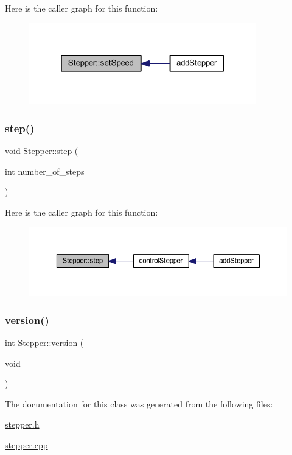 Here is the caller graph for this function\+:
\nopagebreak
\begin{figure}[H]
\begin{center}
\leavevmode
\includegraphics[width=280pt]{dc/db2/class_stepper_a89a1f8b30656437bba8732721d5671e2_icgraph}
\end{center}
\end{figure}
\mbox{\label{class_stepper_a23f1ada8f077bcb8691009648cf29f27}} 
\subsubsection{\texorpdfstring{step()}{step()}}
{\footnotesize\ttfamily void Stepper\+::step (\begin{DoxyParamCaption}\item[{int}]{number\+\_\+of\+\_\+steps }\end{DoxyParamCaption})}

Here is the caller graph for this function\+:
\nopagebreak
\begin{figure}[H]
\begin{center}
\leavevmode
\includegraphics[width=350pt]{dc/db2/class_stepper_a23f1ada8f077bcb8691009648cf29f27_icgraph}
\end{center}
\end{figure}
\mbox{\label{class_stepper_a2b737f8eb9641728af2fb1c24a2560da}} 
\subsubsection{\texorpdfstring{version()}{version()}}
{\footnotesize\ttfamily int Stepper\+::version (\begin{DoxyParamCaption}\item[{void}]{ }\end{DoxyParamCaption})}



The documentation for this class was generated from the following files\+:\begin{DoxyCompactItemize}
\item 
\hyperlink{stepper_8h}{stepper.\+h}\item 
\hyperlink{stepper_8cpp}{stepper.\+cpp}\end{DoxyCompactItemize}
